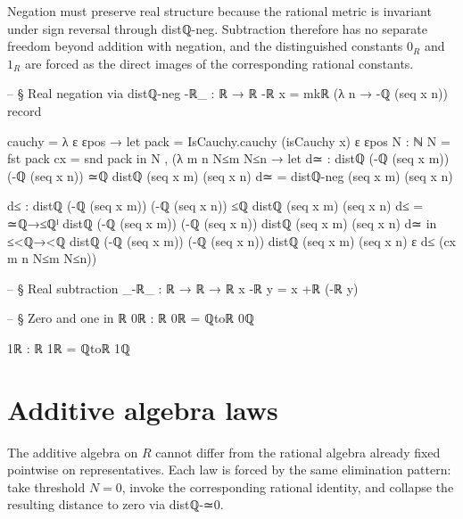 \documentclass[11pt,a4paper]{book}
\def\mathbb#1{#1}%
\def\texttt#1{#1}%
\begin{document}
Negation must preserve real structure because the rational metric is invariant under sign reversal through \texttt{distℚ-neg}. Subtraction therefore has no separate freedom beyond addition with negation, and the distinguished constants $0_{\mathbb{R}}$ and $1_{\mathbb{R}}$ are forced as the direct images of the corresponding rational constants.

\begin{code}
-- § Real negation via distℚ-neg
-ℝ_ : ℝ → ℝ
-ℝ x = mkℝ (λ n → -ℚ (seq x n)) record
  { cauchy = λ ε εpos →
      let
        pack = IsCauchy.cauchy (isCauchy x) ε εpos
        N : ℕ
        N = fst pack
        cx = snd pack
      in
      N , (λ m n N≤m N≤n →
        let
          d≃ : distℚ (-ℚ (seq x m)) (-ℚ (seq x n)) ≃ℚ distℚ (seq x m) (seq x n)
          d≃ = distℚ-neg (seq x m) (seq x n)

          d≤ : distℚ (-ℚ (seq x m)) (-ℚ (seq x n)) ≤ℚ distℚ (seq x m) (seq x n)
          d≤ = ≃ℚ→≤ℚˡ {distℚ (-ℚ (seq x m)) (-ℚ (seq x n))} {distℚ (seq x m) (seq x n)} d≃
        in
        ≤<ℚ→<ℚ {distℚ (-ℚ (seq x m)) (-ℚ (seq x n))} {distℚ (seq x m) (seq x n)} {ε} d≤ (cx m n N≤m N≤n))
  }

-- § Real subtraction
_-ℝ_ : ℝ → ℝ → ℝ
x -ℝ y = x +ℝ (-ℝ y)

-- § Zero and one in ℝ
0ℝ : ℝ
0ℝ = ℚtoℝ 0ℚ

1ℝ : ℝ
1ℝ = ℚtoℝ 1ℚ
\end{code}


\section{Additive algebra laws}

The additive algebra on $\mathbb{R}$ cannot differ from the rational algebra already fixed pointwise on representatives. Each law is forced by the same elimination pattern: take threshold $N = 0$, invoke the corresponding rational identity, and collapse the resulting distance to zero via \texttt{distℚ-≃0}.
\end{document}
